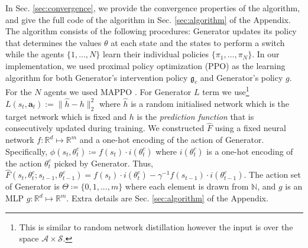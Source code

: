 \documentclass{article}
\begin{document}
In Sec. \ref{sec:convergence}, we provide the convergence properties of the algorithm, 
and give the full code of the algorithm in Sec. \ref{sec:algorithm} of the Appendix.  The algorithm consists of the following procedures: {\selectfont Generator} updates its policy that determines the values $\theta$ at each state
and the states to perform a switch
 while the agents $\{1,\ldots,N\}$ learn their individual policies $\{\pi_1,\ldots,\pi_N\}$.
% 
In our implementation, we used proximal policy optimization (PPO) \cite{schulman2017Proximal} as the learning algorithm for both {\selectfont Generator}'s intervention policy $\mathfrak{g}_c$ and {\selectfont Generator}'s policy $g$. For the $N$ agents we used MAPPO \cite{yu2021surprising}.
% 
For {\selectfont Generator} $L$ term we use\footnote{This is similar to random network distillation \cite{burda2018exploration} however the input is over the space $\mathcal{A}\times\mathcal{S}$.} $L(s_{t}, \boldsymbol{a}_t):=\|\hat{h} - \mathit{h}\|_{2}^{2}$  where $\hat{h}$ is a random initialised network which is the target network which is fixed and $\mathit{h}$ is the \textit{prediction function} that is consecutively updated during training. We constructed $\hat{F}$ using a fixed neural network $f:\mathbb{R}^d \mapsto \mathbb{R}^m$ and a one-hot encoding of the action of {\selectfont Generator}. Specifically, $\phi(s_t, \theta^c_t) \coloneqq f(s_t) \cdot i(\theta^c_t)$ where $i(\theta^c_t)$ is a one-hot encoding of the action $\theta^c_t$ picked by {\selectfont Generator}. Thus, $\hat{F}(s_t, \theta^c_t; s_{t-1}, \theta^c_{t-1}) = f(s_t) \cdot i(\theta^c_t)  - \gamma^{-1} f(s_{t-1}) \cdot i(\theta^c_{t-1})$. The action set of {\selectfont Generator} is $\Theta \coloneqq \{0, 1,..., m\}$ where each element is drawn from $\mathbb{N}$, and $g$ is an MLP $g: \mathbb{R}^d    \mapsto \mathbb{R}^m$. Extra details are Sec. \ref{sec:algorithm} of the Appendix.

	    
\end{document}
